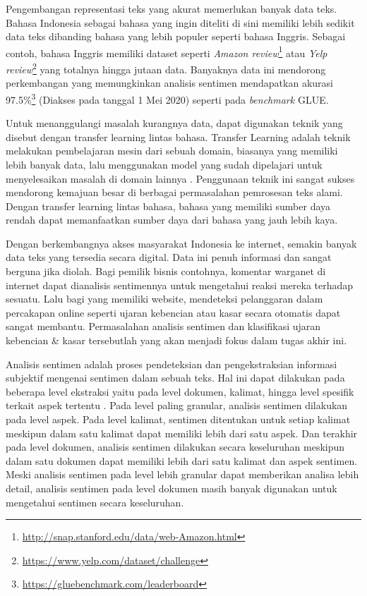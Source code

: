 Pengembangan representasi teks yang akurat memerlukan banyak data teks. Bahasa Indonesia sebagai bahasa yang ingin diteliti di sini memiliki lebih sedikit data teks dibanding bahasa yang lebih populer seperti bahasa Inggris. Sebagai contoh, bahasa Inggris memiliki dataset seperti \textit{Amazon review}\footnote{\url{http://snap.stanford.edu/data/web-Amazon.html}} atau \textit{Yelp review}\footnote{\url{https://www.yelp.com/dataset/challenge}} yang totalnya hingga jutaan data. Banyaknya data ini mendorong perkembangan yang memungkinkan analisis sentimen mendapatkan akurasi 97.5\%\footnote{\url{https://gluebenchmark.com/leaderboard}} (Diakses pada tanggal 1 Mei 2020) seperti pada \textit{benchmark} GLUE\parencite{GLUE2019}.

Untuk menanggulangi masalah kurangnya data, dapat digunakan teknik yang disebut dengan transfer learning lintas bahasa. Transfer Learning adalah teknik melakukan pembelajaran mesin dari sebuah domain, biasanya yang memiliki lebih banyak data, lalu menggunakan model yang sudah dipelajari untuk menyelesaikan masalah di domain lainnya \parencite{ruder2019transfer}. Penggunaan teknik ini sangat sukses mendorong kemajuan besar di berbagai permasalahan pemrosesan teks alami. Dengan transfer learning lintas bahasa, bahasa yang memiliki sumber daya rendah dapat memanfaatkan sumber daya dari bahasa yang jauh lebih kaya.

Dengan berkembangnya akses masyarakat Indonesia ke internet, semakin banyak data teks yang tersedia secara digital. Data ini penuh informasi dan sangat berguna jika diolah. Bagi pemilik bisnis contohnya, komentar warganet di internet dapat dianalisis sentimennya untuk mengetahui reaksi mereka terhadap sesuatu. Lalu bagi yang memiliki website, mendeteksi pelanggaran dalam percakapan online seperti ujaran kebencian atau kasar secara otomatis dapat sangat membantu. Permasalahan analisis sentimen dan klasifikasi ujaran kebencian \& kasar tersebutlah yang akan menjadi fokus dalam tugas akhir ini.

Analisis sentimen adalah proses pendeteksian dan pengekstraksian informasi subjektif mengenai sentimen dalam sebuah teks. Hal ini dapat dilakukan pada beberapa level ekstraksi yaitu pada level dokumen, kalimat, hingga level spesifik terkait aspek tertentu \parencite{Liu2012}. Pada level paling granular, analisis sentimen dilakukan pada level aspek. Pada level kalimat, sentimen ditentukan untuk setiap kalimat meskipun dalam satu kalimat dapat memiliki lebih dari satu aspek. Dan terakhir pada level dokumen, analisis sentimen dilakukan secara keseluruhan meskipun dalam satu dokumen dapat memiliki lebih dari satu kalimat dan aspek sentimen. Meski analisis sentimen pada level lebih granular dapat memberikan analisa lebih detail, analisis sentimen pada level dokumen masih banyak digunakan untuk mengetahui sentimen secara keseluruhan.

